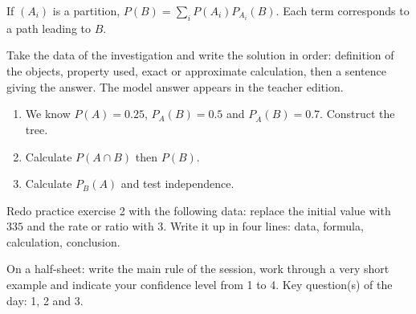    \begin{traceecrite}If $(A_i)$ is a partition, $P(B)=\sum_i P(A_i)P_{A_i}(B)$. Each term corresponds to a path leading to $B$.\end{traceecrite}

    \begin{exemple}
    Take the data of the investigation and write the solution in order: definition of the objects, property used, exact or approximate calculation, then a sentence giving the answer. The model answer appears in the teacher edition.
    \end{exemple}

    \begin{exercice}[-- essential]
    \begin{enumerate}\item We know $P(A)=0.25$, $P_A(B)=0.5$ and $P_{\overline A}(B)=0.7$. Construct the tree.\item Calculate $P(A\cap B)$ then $P(B)$.\item Calculate $P_B(A)$ and test independence.\end{enumerate}
    \end{exercice}


    \begin{dm}Redo practice exercise 2 with the following data: replace the initial value with $335$ and the rate or ratio with $3$. Write it up in four lines: data, formula, calculation, conclusion.\end{dm}

    \begin{sortie}On a half-sheet: write the main rule of the session, work through a very short example and indicate your confidence level from 1 to 4. Key question(s) of the day: 1, 2 and 3.\end{sortie}

